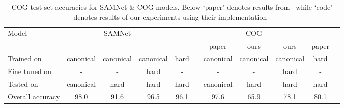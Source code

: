 \begin{table*}[htb]
	\caption{COG test set accuracies for SAMNet \& COG models. Below `paper' denotes results from~\cite{yang2018dataset} 
		while `code' denotes results of our experiments using their implementation~\cite{yang2018implement}}
	\centering
	\begin{adjustbox}{width=\textwidth}
		\begin{tabular}{lcccccccccc}
			\toprule
			Model & & SAMNet & && && COG&& \\
			\cmidrule{2-5} \cmidrule{7-11} 
			&&&&& & paper & ours & ours & paper&\\
			\cmidrule{7-9} \cmidrule{10-11}
			Trained on       & canonical & canonical & canonical & hard &           &  canonical  & canonical  & canonical & hard \\ 
			Fine tuned on  & - & - & hard  & - &           & -   & - & hard & - \\ 
			Tested on        & canonical & hard & hard & hard &            &canonical  & hard & hard & hard  \\ 
			\midrule
			
			Overall accuracy & 98.0 & 91.6 & 96.5  & 96.1 &           & 97.6  & 65.9 & 78.1& 80.1 \\ 
			
			\midrule 
			

\end{tabular}
\end{adjustbox}
\end{table*}

